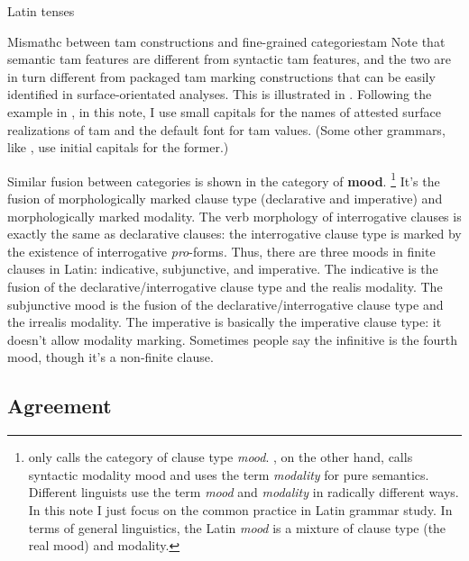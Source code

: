 \documentclass[a4paper, oneside, 12pt]{report}
\newcommand*{\concept}[1]{\textbf{#1}}
\newcommand*{\term}[1]{\emph{#1}}
\begin{document}
\begin{table}[H]
    \caption{Latin tenses}
    \label{tbl:latin-tense-aspect}
    \centering
        
\end{table}

\begin{infobox}{Mismathc between \ac{tam} constructions and fine-grained categories}{tam}
    Note that semantic \ac{tam} features are different from 
    syntactic \ac{tam} features,
    and the two are in turn different from packaged \ac{tam} marking constructions
    that can be easily identified in surface-orientated analyses.
    This is illustrated in .
    Following the example in \citet{grimm2021grammar},
    in this note, I use small capitals for the names of attested surface realizations of \ac{tam}
    and the default font for \ac{tam} values.
    (Some other grammars, like \citet{jacques2021grammar,friesen2017grammar}, 
    use initial capitals for the former.)
\end{infobox}

Similar fusion between categories is shown in the category of \concept{mood}.%
\footnote{
    \citet{dixon2009basic1} only calls the category of clause type \term{mood}.
    \citet{cgel}, on the other hand, 
    calls syntactic modality mood 
    and uses the term \term{modality} for pure semantics.
    Different linguists use the term \term{mood} and \term{modality} in radically different ways.
    In this note I just focus on the common practice in Latin grammar study.
    In terms of general linguistics, 
    the Latin \term{mood} is a mixture of clause type (the real mood)
    and modality.
}
It's the fusion of morphologically marked clause type 
(declarative and imperative)
and morphologically marked modality.
The verb morphology of interrogative clauses is exactly the same as declarative clauses:
the interrogative clause type is marked by the existence of interrogative \term{pro}-forms.
Thus, there are three moods in finite clauses in Latin:
\acl{indicative}, \acl{subjunctive}, and \acl{imperative}.
The \acl{indicative} is the fusion of 
the declarative/interrogative clause type and the realis modality.
The \acl{subjunctive} mood is the fusion of 
the declarative/interrogative clause type and the irrealis modality.
The \acl{imperative} is basically the imperative clause type:
it doesn't allow modality marking.
Sometimes people say the infinitive is the fourth mood,
though it's a non-finite clause.


\subsection{Agreement}\label{sec:agreement-abs}
\end{document}
